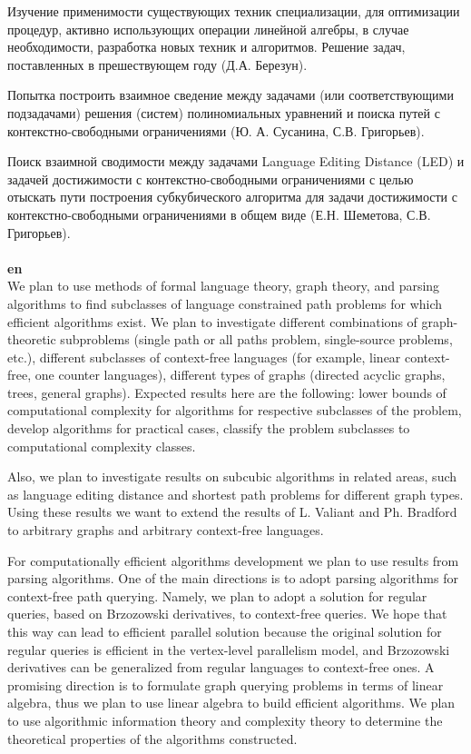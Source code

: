 \documentclass[12pt]{article}  %
\theoremstyle{remark}
\begin{document}
Изучение применимости существующих техник специализации, для оптимизации процедур, активно использующих операции линейной алгебры, в случае необходимости, разработка новых техник и алгоритмов. Решение задач, поставленных в прешествующем году (Д.А. Березун).

Попытка построить взаимное сведение между задачами (или соответствующими подзадачами) решения (систем) полиномиальных уравнений и поиска путей с контекстно-свободными ограничениями (Ю. А. Сусанина, С.В. Григорьев).

Поиск взаимной сводимости между задачами Language Editing Distance (LED) и задачей достижимости с контекстно-свободными ограничениями с целью отыскать пути построения субкубического алгоритма для задачи достижимости с контекстно-свободными ограничениями в общем виде (Е.Н. Шеметова, С.В. Григорьев).
\\
\\
\textbf{en}\\
We plan to use methods of formal language theory, graph theory, and parsing algorithms to find subclasses of language constrained path problems for which efficient algorithms exist. We plan to investigate different combinations of graph-theoretic subproblems (single path or all paths problem, single-source problems, etc.), different subclasses of context-free languages (for example, linear context-free, one counter languages), different types of graphs (directed acyclic graphs, trees, general graphs). Expected results here are the following: lower bounds of computational complexity for algorithms for respective subclasses of the problem, develop algorithms for practical cases, classify the problem subclasses to computational complexity classes.

Also, we plan to investigate results on subcubic algorithms in related areas, such as language editing distance and shortest path problems for different graph types. Using these results we want to extend the results of L. Valiant and Ph. Bradford to arbitrary graphs and arbitrary context-free languages.

For computationally efficient algorithms development we plan to use results from parsing algorithms. One of the main directions is to adopt parsing algorithms for context-free path querying. Namely, we plan to adopt a solution for regular queries, based on Brzozowski derivatives, to context-free queries. We hope that this way can lead to efficient parallel solution because the original solution for regular queries is efficient in the vertex-level parallelism model, and Brzozowski derivatives can be generalized from regular languages to context-free ones. A promising direction is to formulate graph querying problems in terms of linear algebra, thus we plan to use linear algebra to build efficient algorithms. We plan to use algorithmic information theory and complexity theory to determine the theoretical properties of the algorithms constructed.
\end{document}
